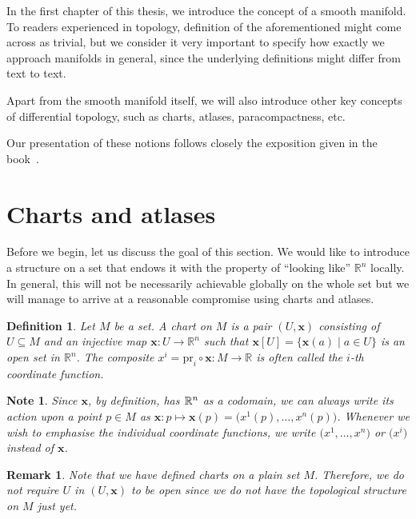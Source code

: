 \documentclass[11pt,a4paper,twoside,openany]{report}
\theoremstyle{my-theorem}
\theoremstyle{non-theorem}
\newtheorem{definition}[theorem]{Definition}
\newtheorem{remark}[theorem]{Remark}
\newtheorem{note}[theorem]{Note}
\begin{document}
	In the first chapter of this thesis, we introduce the concept of a smooth manifold. To readers experienced in topology, definition of the aforementioned might come across as trivial, but we consider it very important to specify how exactly we approach manifolds in general, since the underlying definitions might differ from text to text.
	
	Apart from the smooth manifold itself, we will also introduce other key concepts of differential topology, such as charts, atlases, paracompactness, etc.
	
	Our presentation of these notions follows closely the exposition given in the book~\cite{lee:manifolds-and-differential-geometry}.
	
	\section{Charts and atlases}
	
		Before we begin, let us discuss the goal of this section. We would like to introduce a structure on a set that endows it with the property of ``looking like'' $\mathbb R^n$ locally. In general, this will not be necessarily achievable globally on the whole set but we will manage to arrive at a reasonable compromise using charts and atlases.
	
		\begin{definition}
			Let $M$ be a set. A \emph{chart} on $M$ is a pair $(U,\mathbf x)$ consisting of $U \subseteq M$ and an injective map $\mathbf x:U \to \mathbb R^n$ such that $\mathbf x[U] = \{\mathbf x(a) \mid a \in U\}$ is an open set in $\mathbb R^n$. The composite $x^i = \mathrm{pr}_i \circ \mathbf x: M \to \mathbb R$ is often called the \emph{$i$-th coordinate function}.
		\end{definition}
		
		\begin{note}
			Since $\mathbf x$, by definition, has ${\mathbb R}^n$ as a codomain, we can always write its action upon a point $p \in M$ as $\mathbf x: p \mapsto \mathbf x(p) = \big( x^1(p),\dots,x^n(p) \big)$. Whenever we wish to emphasise the individual coordinate functions, we write $\big( x^1,\dots,x^n \big)$ or $\big( x^i \big)$ instead of $\mathbf x$.
		\end{note}
		
		\begin{remark}
			Note that we have defined charts on a plain set $M$. Therefore, we do not require $U$ in $(U,\mathbf x)$ to be open since we do not have the topological structure on $M$ just yet.
		\end{remark}
	
\end{document}
